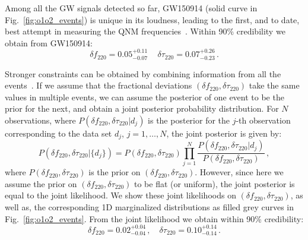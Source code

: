 \documentclass[twocolumn,prd,aps,superscriptaddress,preprintnumbers,tightenlines,showpacs,nofootinbib,eqsecnum,amsfonts,amsmath]{revtex4-1}
\newcommand{\df}[1]{\delta f_{\text{#1}}}
\newcommand{\dtau}[1]{\delta \tau_{\text{#1}}}
\begin{document}
Among all the GW signals detected so far, GW150914 (solid curve in
Fig.~\ref{fig:o1o2_events}) is unique in its loudness, leading to the
first, and to date, best attempt in measuring the QNM
frequencies~\cite{TheLIGOScientific:2016src,Brito:2018rfr,Carullo:2019flw,Isi:2019aib}. Within
90\% credibility we obtain from GW150914:
%
\begin{equation}\label{GW150914_delta}
\df{220}=0.05^{+0.11}_{-0.07}\,\quad \dtau{220}=0.07^{+0.26}_{-0.23}\,.
\end{equation}

Stronger constraints can be obtained by combining information from all the events~\cite{Abbott:2020jks}. If we assume that the fractional deviations $(\df{220},\dtau{220})$ take the same values in multiple events, we can assume
the posterior of one event to be the prior for the next, and obtain a
joint posterior probability distribution. For $N$ observations, where
$P(\df{220}, \dtau{220} | d_j)$ is the posterior for the $j$-th
observation corresponding to the data set $d_j$, $j=1,\dots,N$, the joint
posterior is given by:
%
\begin{equation}
P(\df{220}, \dtau{220} | \{d_j\}) = P(\df{220}, \dtau{220}) \prod _{j=1}^N \frac{P(\df{220}, \dtau{220} | d_j) }{P(\df{220}, \dtau{220})}\,,
\end{equation}
%
where $P(\df{220}, \dtau{220})$ is the prior on $(\df{220},
\dtau{220})$. However, since here we assume the prior on $(\df{220},
\dtau{220})$ to be flat (or uniform), the joint posterior is equal to
the joint likelihood. We show these joint likelihoods on $(\df{220}, \dtau{220})$, as well as, the corresponding 1D marginalized distributions as filled grey curves in Fig.~\ref{fig:o1o2_events}. From the joint likelihood we obtain within 90\% credibility: 
%
\begin{equation}
\df{220}=0.02^{+0.04}_{-0.04}\,,\quad \dtau{220}=0.10^{+0.14}_{-0.14}\,.
\end{equation}
%
\end{document}
